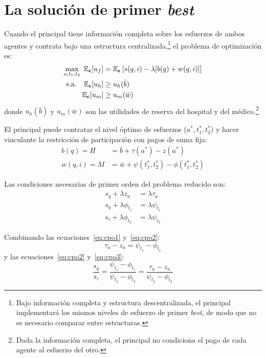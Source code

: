 \section{La solución de primer \texorpdfstring{\textit{best}}{best}}
\label{sec:primer_best}

Cuando el principal tiene información completa sobre los esfuerzos de ambos agentes y contrata bajo una estructura centralizada,\footnote{Bajo información completa y estructura descentralizada, el principal implementará los mismos niveles de esfuerzo de primer \textit{best}, de modo que no es necesario comparar entre estructuras.} el problema de optimización es:
\begin{align*}
    \max_{a,t_1,t_2}\ \mathbb{E}_{\bm{\epsilon}}[u_f] &= \mathbb{E}_{\bm{\epsilon}}\left[s(q,i)-\lambda[b(q)+w(q,i)]\right]\\
    \text{s.a.}\quad \mathbb{E}_{\bm{\epsilon}}[u_h] &\geq u_h(\bar{b})\\
    \mathbb{E}_{\bm{\epsilon}}[u_m] &\geq u_m(\bar{w})
\end{align*}
donde $u_h(\bar{b})$ y $u_m(\bar{w})$ son las utilidades de reserva del hospital y del médico.\footnote{Dada la información completa, el principal no condiciona el pago de cada agente al esfuerzo del otro.}

El principal puede contratar el nivel óptimo de esfuerzos ($a^*,t^*_1,t^*_2$) y hacer vinculante la restricción de participación con pagos de suma fija:
\begin{align}
  b(q) = H &= \bar{b}+\tau(a^*)-z(a^*) \label{eq:pago_h_fb}\\
  w(q,i) = M &= \bar{w}+\psi(t_1^*,t_2^*)-\phi(t_1^*,t_2^*) \label{eq:pago_m_fb}
\end{align}

Las condiciones necesarias de primer orden del problema reducido son:
\begin{align}
  s_q+\lambda z_a &= \lambda\tau_a \label{eq:cpo1}\\
  s_q+\lambda\phi_{t_1} &= \lambda\psi_{t_1} \label{eq:cpo2}\\
  s_i+\lambda\phi_{t_2} &= \lambda\psi_{t_2} \label{eq:cpo3}
\end{align}

Combinando las ecuaciones~\eqref{eq:cpo1} y~\eqref{eq:cpo2}:
\begin{equation}
    \tau_a-z_a=\psi_{t_1}-\phi_{t_1}
    \label{eq:cpo_q}
\end{equation}
y las ecuaciones~\eqref{eq:cpo2} y~\eqref{eq:cpo3}:
\begin{equation}
  \frac{s_q}{s_i}=\frac{\psi_{t_1}-\phi_{t_1}}{\psi_{t_2}-\phi_{t_2}}=\frac{\tau_a-z_a}{\psi_{t_2}-\phi_{t_2}}
  \label{eq:cpo_qi}
\end{equation}

